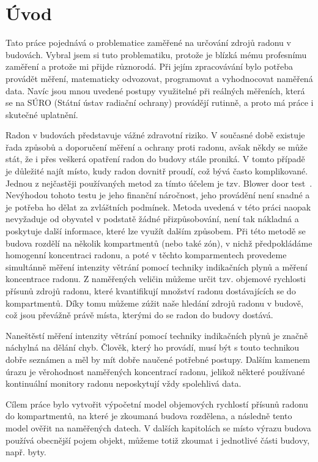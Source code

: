 \chapter{Úvod}
Tato práce pojednává o problematice zaměřené na určování zdrojů radonu v budovách. Vybral jsem si tuto problematiku, protože je blízká mému profesnímu zaměření a protože mi přijde různorodá. Při jejím zpracovávání bylo potřeba provádět měření, matematicky odvozovat, programovat a vyhodnocovat naměřená data. Navíc jsou mnou uvedené postupy využitelné při reálných měřeních, která se na SÚRO (Státní ústav radiační ochrany) provádějí rutinně, a proto má práce i skutečné uplatnění. 

Radon v budovách představuje vážné zdravotní riziko. V současné době existuje řada způsobů a doporučení měření a ochrany proti radonu, avšak někdy se může stát, že i přes veškerá opatření radon do budovy stále proniká. V tomto případě je důležité najít místo, kudy radon dovnitř proudí, což bývá často komplikované. Jednou z nejčastěji používaných metod za tímto účelem je tzv. Blower door test~\cite{wiki_blowerDoorTest}. Nevýhodou tohoto testu je jeho finanční náročnost, jeho provádění není snadné a je potřeba ho dělat za zvláštních podmínek. Metoda uvedená v této práci naopak nevyžaduje od obyvatel v podstatě žádné přizpůsobování, není tak nákladná a poskytuje další informace, které lze využít dalším způsobem. Při této metodě se budova
rozdělí na několik kompartmentů (nebo také zón), v nichž předpokládáme homogenní koncentraci radonu, a poté v těchto komparmentech provedeme simultánně měření intenzity větrání pomocí techniky indikačních plynů a měření koncentrace radonu. Z naměřených veličin můžeme určit tzv. objemové rychlosti přísunů zdrojů radonu, které kvantifikují množství radonu dostávajících se do kompartmentů. Díky tomu můžeme zúžit naše hledání zdrojů radonu v budově, což jsou převážně právě místa, kterými do se radon do budovy dostává.

Naneštěstí měření intenzity větrání pomocí techniky indikačních plynů je značně náchylná na dělání chyb. Člověk, který ho provádí, musí být s touto technikou dobře seznámen a měl by mít dobře naučené potřebné postupy. Dalším kamenem úrazu je věrohodnost naměřených koncentrací radonu, jelikož některé používané kontinuální monitory radonu neposkytují vždy spolehlivá data.

Cílem práce bylo vytvořit výpočetní model objemových rychlostí přísunů radonu do kompartmentů, na které je zkoumaná budova rozdělena, a následně tento model ověřit na naměřených datech. V dalších kapitolách se místo výrazu budova používá obecnější pojem objekt, můžeme totiž zkoumat i jednotlivé části budovy, např. byty.
